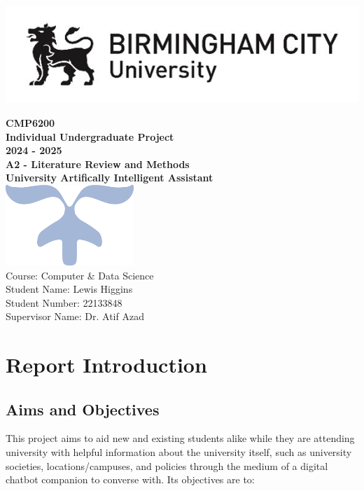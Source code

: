 \documentclass[12pt]{report}
\begin{document}
    \makeatletter
    \begin{titlepage}
        \includegraphics[width=0.3\linewidth]{BCUWide.jpg}\\[4ex]
        \vspace{1cm}
        \begin{center}
            {\huge \bfseries  CMP6200}\\[2ex]
            {\huge \bfseries  Individual Undergraduate Project}\\[2ex]
            {\huge \bfseries 2024 - 2025}\\[6ex]
            {\large \bfseries A2 - Literature Review and Methods}\\[10ex]
            {\huge \bfseries University Artifically Intelligent Assistant}\\[6ex]
            \includegraphics[width=0.1\linewidth]{Symbol.png}\\[40ex]
            Course: Computer \& Data Science\\
            Student Name: Lewis Higgins\\
            Student Number: 22133848\\
            Supervisor Name: Dr. Atif Azad
        \end{center}
    \end{titlepage}
    \makeatother
    \thispagestyle{empty}
    \newpage

    \tableofcontents

    \chapter{Report Introduction}\label{ch:introduction}
    \section{Aims and Objectives}

    \noindent
    This project aims to aid new and existing students alike while they are attending university with 
    helpful information about the university itself, such as university societies, locations/campuses, 
    and policies through the medium of a digital chatbot companion to converse with.
    Its objectives are to:
\end{document}
